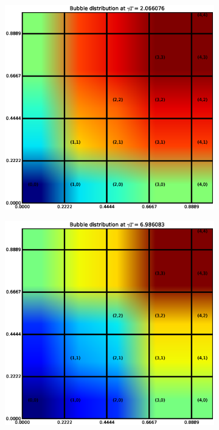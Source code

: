 \begin{figure}
\begin{subfigure}[b]{0.49\textwidth}
  \includegraphics[width=\textwidth]{figs/spatial_bubble-1}
\end{subfigure}
\begin{subfigure}[b]{0.49\textwidth}
  \includegraphics[width=\textwidth]{figs/spatial_bubble-17}

\end{subfigure}
\end{figure}
